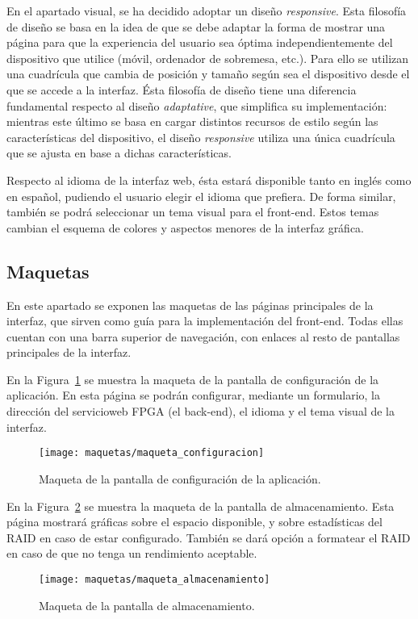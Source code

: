 En el apartado visual, se ha decidido adoptar un diseño \textit{responsive}.
Esta filosofía de diseño se basa en la idea de que se debe adaptar la forma de mostrar una página para que la experiencia del usuario sea óptima independientemente del dispositivo que utilice (móvil, ordenador de sobremesa, etc.).
Para ello se utilizan una cuadrícula que cambia de posición y tamaño según sea el dispositivo desde el que se accede a la interfaz.
Ésta filosofía de diseño tiene una diferencia fundamental respecto al diseño \textit{adaptative}, que simplifica su implementación: mientras este último se basa en cargar distintos recursos de estilo según las características del dispositivo, el diseño \textit{responsive} utiliza una única cuadrícula que se ajusta en base a dichas características.

Respecto al idioma de la interfaz web, ésta estará disponible tanto en inglés como en español, pudiendo el usuario elegir el idioma que prefiera.
De forma similar, también se podrá seleccionar un tema visual para el \gls{front-end}.
Estos temas cambian el esquema de colores y aspectos menores de la interfaz gráfica.


\subsection{Maquetas\label{ssec:dis:maquetas}}

En este apartado se exponen las maquetas de las páginas principales de la interfaz, que sirven como guía para la implementación del \gls{front-end}.
Todas ellas cuentan con una barra superior de navegación, con enlaces al resto de pantallas principales de la interfaz.

En la Figura~\ref{fig:maqueta:configuracion} se muestra la maqueta de la pantalla de configuración de la aplicación.
En esta página se podrán configurar, mediante un formulario, la dirección del \gls{servicioweb} \gls{FPGA} (el \gls{back-end}), el idioma y el tema visual de la interfaz.
\begin{figure}[!htp]
  \centering
  \texttt{[image: maquetas/maqueta\_configuracion]}
  \caption{Maqueta de la pantalla de configuración de la aplicación.}
  \label{fig:maqueta:configuracion}
\end{figure}
\clearpage

En la Figura~\ref{fig:maqueta:almacenamiento} se muestra la maqueta de la pantalla de almacenamiento.
Esta página mostrará gráficas sobre el espacio disponible, y sobre estadísticas del \gls{RAID} en caso de estar configurado.
También se dará opción a formatear el \gls{RAID} en caso de que no tenga un rendimiento aceptable.
\begin{figure}[!htp]
  \centering
  \texttt{[image: maquetas/maqueta\_almacenamiento]}
  \caption{Maqueta de la pantalla de almacenamiento.}
  \label{fig:maqueta:almacenamiento}
\end{figure}
\clearpage


